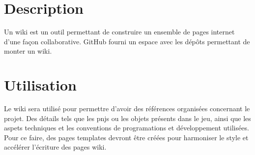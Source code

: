 \section{Description}
Un wiki est un outil permettant de construire un ensemble de pages internet d'une façon collaborative. GitHub fourni un espace avec les dépôts permettant de monter un wiki.
\section{Utilisation}
Le wiki sera utilisé pour permettre d'avoir des références organisées concernant le projet. Des détails tels que les pnjs ou les objets présents dans le jeu, ainsi que les aspets techniques et les conventions de programations et développement utilisées.
Pour ce faire, des pages templates devront être créées pour harmoniser le style et accélérer l'écriture des pages wiki.